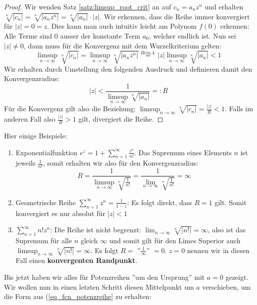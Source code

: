 \begin{proof}
Wir wenden Satz \ref{satz:limsup_root_crit} an auf $c_n = a_nz^n$ und erhalten $\sqrt[n]{|c_n|} = \sqrt[n]{|a_nz^n|} = \sqrt[n]{|a_n|}\cdot|z|$. Wir erkennen, dass die Reihe immer konvergiert für $|z| = 0 = z$. Dies kann man auch intuitiv leicht am Polynom $f(0)$ erkennen: Alle Terme sind 0 ausser der konstante Term $a_0$, welcher endlich ist. Nun sei $|z| \neq 0$, dann muss für die Konvergenz mit dem Wurzelkriterium gelten:
$$\limsup_{n \to \infty} \sqrt[n]{|c_n|} = \limsup_{n \to \infty} \sqrt[n]{|a_nz^n|} \stackrel{Bem. 4.}{=} |z| \limsup_{n \to \infty} \sqrt[n]{|a_n|} < 1$$
Wir erhalten durch Umstellung den folgenden Ausdruck und definieren damit den Konvergenzradius:
$$|z| < \frac{1}{\limsup_{n \to \infty} \sqrt[n]{|a_n|}} =: R$$
Für die Konvergenz gilt also die Beziehung: $\limsup_{n \to \infty} \sqrt[n]{|c_n|} = \frac{|z|}{R} < 1$. Falls im anderen Fall also  $\frac{|z|}{R} > 1$ gilt, divergiert die Reihe.
\end{proof}

\begin{example} Hier einige Beispiele:
\begin{enumerate}[label=\alph*)]
    \item Exponentialfunktion $e^z = 1 + \sum_{n = 1}^\infty \frac{z^n}{n!}$. Das Supremum eines Elements $n$ ist jeweils $\frac{1}{n!}$, somit erhalten wir also für den Konvergenzradius:
    $$R = \frac{1}{\limsup_{n \to \infty}\sqrt[n]{\frac{1}{n!}}} = \frac{1}{\lim_{n \to \infty}\sqrt[n]{\frac{1}{n!}}} = \infty$$
    \item Geometrische Reihe $\sum_{n = 1}^\infty z^n = \frac{1}{1-z}$: Es folgt direkt, dass $R = 1$ gilt. Somit konvergiert es nur absolut für $|z| < 1$
    \item $\sum_{n = 1}^\infty n! z^n$: Die Reihe ist nicht begrenzt: $\lim_{n \to \infty} \sqrt[n]{|n!|} = \infty$, also ist das Supremum für alle $n$ gleich $\infty$ und somit gilt für den Limes Superior auch $\limsup_{n \to \infty}\sqrt[n]{|n!|} = \infty$. Es folgt $R =$ ''$\frac{1}{\infty}$'' $ = 0$. $z = 0$ nennen wir in diesen Fall einen \textbf{konvergenten Randpunkt}.
\end{enumerate}
\end{example}

Bis jetzt haben wir alles für Potenzreihen ''um den Ursprung'' mit $a = 0$ gezeigt. Wir wollen nun in einen letzten Schritt diesen Mittelpunkt um $a$ verschieben, um die Form aus (\ref{eq_fcn_potenzreihe} zu erhalten:

